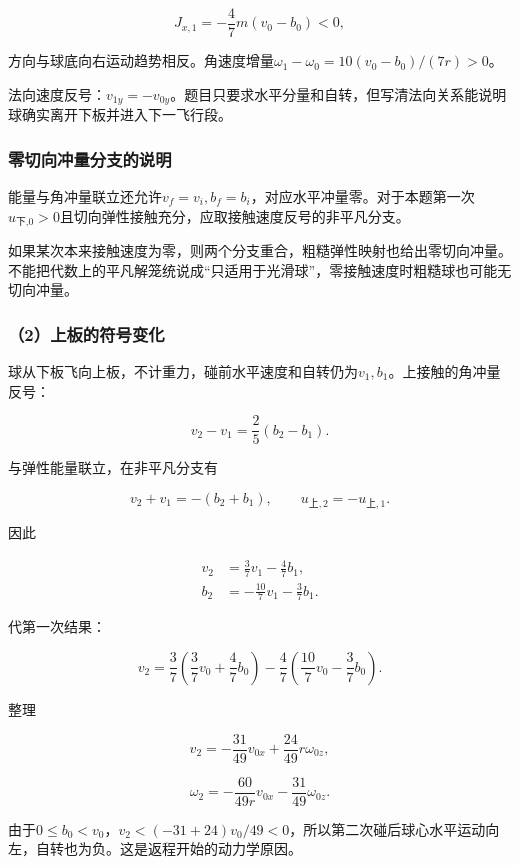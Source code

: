 \documentclass[12pt,a4paper,fontset=fandol]{ctexart}
\begin{document}
\[
J_{x,1}=-\frac47m(v_0-b_0)<0,
\]

方向与球底向右运动趋势相反。角速度增量\(\omega_1-\omega_0=10(v_0-b_0)/(7r)>0\)。

法向速度反号：\(v_{1y}=-v_{0y}\)。题目只要求水平分量和自转，但写清法向关系能说明球确实离开下板并进入下一飞行段。

\subsubsection{零切向冲量分支的说明}\label{ux96f6ux5207ux5411ux51b2ux91cfux5206ux652fux7684ux8bf4ux660e}

能量与角冲量联立还允许\(v_f=v_i,b_f=b_i\)，对应水平冲量零。对于本题第一次\(u_{\text{下,0}}>0\)且切向弹性接触充分，应取接触速度反号的非平凡分支。

如果某次本来接触速度为零，则两个分支重合，粗糙弹性映射也给出零切向冲量。不能把代数上的平凡解笼统说成``只适用于光滑球''，零接触速度时粗糙球也可能无切向冲量。

\subsubsection{（2）上板的符号变化}\label{ux4e0aux677fux7684ux7b26ux53f7ux53d8ux5316}

球从下板飞向上板，不计重力，碰前水平速度和自转仍为\(v_1,b_1\)。上接触的角冲量反号：

\[
v_2-v_1=\frac25(b_2-b_1).
\]

与弹性能量联立，在非平凡分支有

\[
v_2+v_1=-(b_2+b_1),
\qquad
u_{{\text{上}},2}=-u_{{\text{上}},1}.
\]

因此

\[
\begin{aligned}
v_2&=\frac37v_1-\frac47b_1,\\
b_2&=-\frac{10}{7}v_1-\frac37b_1.
\end{aligned}
\]

代第一次结果：

\[
v_2=\frac37\left(\frac37v_0+\frac47b_0\right)
-\frac47\left(\frac{10}{7}v_0-\frac37b_0\right).
\]

整理

\[
\boxed{v_2=-\frac{31}{49}v_{0x}
+\frac{24}{49}r\omega_{0z}},
\]

\[
\boxed{\omega_2=-\frac{60}{49r}v_{0x}
-\frac{31}{49}\omega_{0z}}.
\]

由于\(0\leq b_0<v_0\)，\(v_2<(-31+24)v_0/49<0\)，所以第二次碰后球心水平运动向左，自转也为负。这是返程开始的动力学原因。
\end{document}
